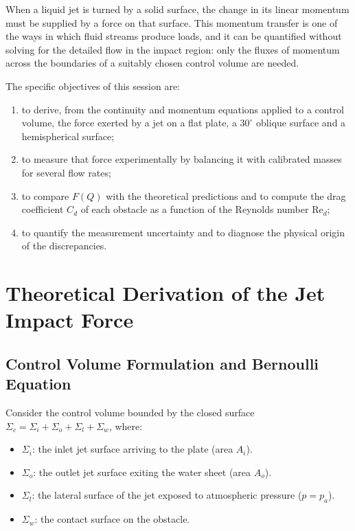 \documentclass[11pt,a4paper]{article}
\numberwithin{equation}{section}
\newcommand{\Cd}{C_d}
\newcommand{\Red}{\mathrm{Re}_d}
\begin{document}
When a liquid jet is turned by a solid surface, the change in its linear momentum must be supplied by a force on that surface. This momentum transfer is one of the ways in which fluid streams produce loads, and it can be quantified without solving for the detailed flow in the impact region: only the fluxes of momentum across the boundaries of a suitably chosen control volume are needed.

The specific objectives of this session are:
\begin{enumerate}[leftmargin=1.5em, itemsep=0.2em]
  \item to derive, from the continuity and momentum equations applied to a control volume, the force exerted by a jet on a flat plate, a $30^\circ$ oblique surface and a hemispherical surface;
  \item to measure that force experimentally by balancing it with calibrated masses for several flow rates;
  \item to compare $F(Q)$ with the theoretical predictions and to compute the drag coefficient $\Cd$ of each obstacle as a function of the Reynolds number $\Red$;
  \item to quantify the measurement uncertainty and to diagnose the physical origin of the discrepancies.
\end{enumerate}

\section{Theoretical Derivation of the Jet Impact Force}
\subsection{Control Volume Formulation and Bernoulli Equation}
Consider the control volume bounded by the closed surface $\Sigma_c = \Sigma_i + \Sigma_o + \Sigma_l + \Sigma_w$, where:
\begin{itemize}
    \item $\Sigma_i$: the inlet jet surface arriving to the plate (area $A_i$).
    \item $\Sigma_o$: the outlet jet surface exiting the water sheet (area $A_o$).
    \item $\Sigma_l$: the lateral surface of the jet exposed to atmospheric pressure ($p = p_a$).
    \item $\Sigma_w$: the contact surface on the obstacle.
\end{itemize}
\end{document}
